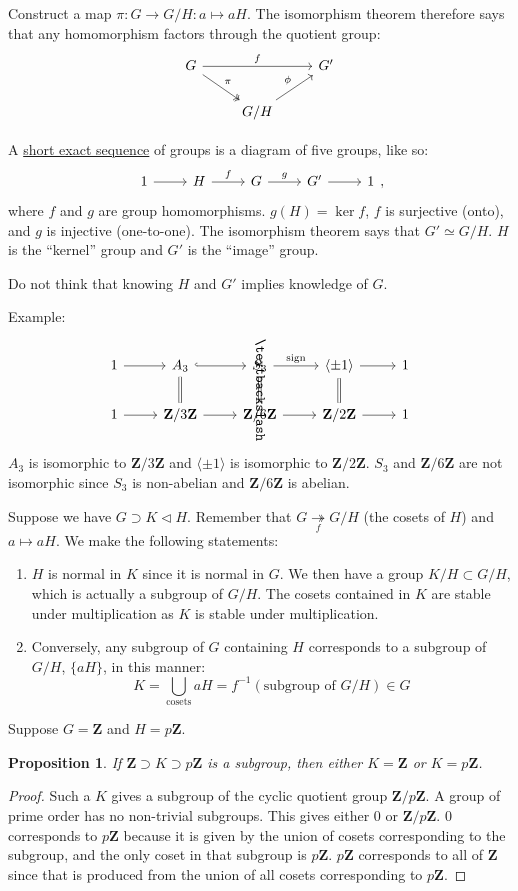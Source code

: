 \documentclass[11pt, oneside]{amsart}
\numberwithin{equation}{section}
\numberwithin{theorem}{section}
\newtheorem{proposition}[theorem]{Proposition}
\theoremstyle{definition}
\def\Z{\mathbf{Z}}
\begin{document}
Construct a map $\pi :G\to G/H:a\mapsto aH$. The isomorphism theorem therefore says that any homomorphism factors through the quotient group:
$$
 \begin{tikzcd}[]
G \arrow[two heads]{dr}{\pi} \arrow{rr}{f}
    & & G'  \\
& G/H\arrow{ur}{\phi}  \end{tikzcd}
$$

A \underline{short exact sequence} of groups is a diagram of five groups, like so:
$$
 \begin{tikzcd}[]
1\arrow{r} & H\arrow{r}{f} & G\arrow{r}{g} & G' \arrow{r} & 1
\end{tikzcd},
$$
where $f$ and $g$ are group homomorphisms. $g(H)=\ker f$, $f$ is surjective (onto), and $g$ is injective (one-to-one). The isomorphism theorem says that $G'\simeq G/H$. $H$ is the ``kernel'' group and $G'$ is the ``image'' group.

Do not think that knowing $H$ and $G'$ implies knowledge of $G$.

Example: 
$$
 \begin{tikzcd}[]
1 \arrow{r} & A_3 \arrow[hookrightarrow]{r}\arrow[equal]{d} & S_3\arrow[equal, "\textbackslash" marking]{d} \arrow{r}{\textrm{sign}} & \langle \pm 1 \rangle\arrow[equal]{d} \arrow{r} & 1\\
1 \arrow{r} &\Z/3\Z\arrow{r} & \Z/6\Z \arrow{r} & \Z/2\Z\arrow{r} & 1
\end{tikzcd}
$$
$A_3$ is isomorphic to $\Z/3\Z$ and $\langle \pm 1 \rangle$ is isomorphic to $\Z/2\Z$. $S_3$ and $\Z/6\Z$ are not isomorphic since $S_3$ is non-abelian and $\Z/6\Z$ is abelian.

Suppose we have $G\supset K \lhd H$. Remember that $G\underset{f}{\twoheadrightarrow}G/H$ (the cosets of $H$) and $a\mapsto aH$.
We make the following statements:
\begin{enumerate}[label=(\roman*)]
\item $H$ is normal in $K$ since it is normal in $G$. We then have a group $K/H \subset G/H$, which is actually a subgroup of $G/H$. The cosets contained in $K$ are stable under multiplication as $K$ is stable under multiplication.
\item Conversely, any subgroup of $G$ containing $H$ corresponds to a subgroup of $G/H$, $\{aH\}$, in this manner:
$$
K = \bigcup_{\textrm{cosets}} aH = f^{-1}(\textrm{subgroup of }G/H)\in G
$$
\end{enumerate}

Suppose $G=\Z$ and $H=p\Z$.
\begin{proposition}
If $\Z\supset K\supset p\Z$ is a subgroup, then either $K=\Z$ or $K=p\Z$.
\end{proposition}
\begin{proof}
Such a $K$ gives a subgroup of the cyclic quotient group $\Z/p\Z$. A group of prime order has no non-trivial subgroups. This gives either 0 or $\Z/p\Z$. 0 corresponds to $p\Z$ because it is given by the union of cosets corresponding to the subgroup, and the only coset in that subgroup is $p\Z$. $p\Z$ corresponds to all of $\Z$ since that is produced from the union of all cosets corresponding to $p\Z$.
\end{proof}
\end{document}

